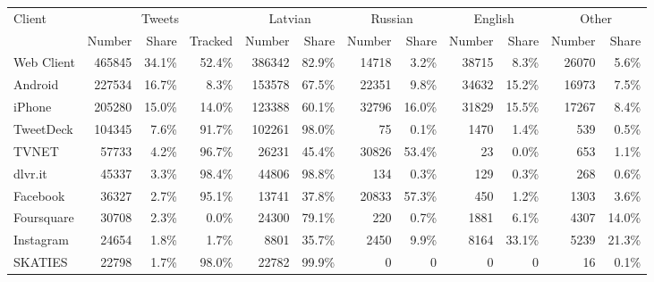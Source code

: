 \begin{tabular}{lrrrrrrrrrrr} 
\toprule
\multirow{2}{*}{Client} & \multicolumn{3}{c}{Tweets} & \multicolumn{2}{c}{Latvian} & \multicolumn{2}{c}{Russian} & \multicolumn{2}{c}{English} & \multicolumn{2}{c}{Other} \\
\cmidrule(r){2-4} \cmidrule(r){5-6} \cmidrule(r){7-8} \cmidrule(r){9-10} \cmidrule(r){11-12}
{} &  Number & Share & Tracked & Number & Share & Number & Share & Number & Share & Number & Share \\
\midrule
Web Client          &      465845 &       34.1\% &                52.4\% &            386342 &             82.9\% &             14718 &              3.2\% &             38715 &              8.3\% &            26070 &             5.6\% \\
Android             &      227534 &       16.7\% &                 8.3\% &            153578 &             67.5\% &             22351 &              9.8\% &             34632 &             15.2\% &            16973 &             7.5\% \\
iPhone              &      205280 &       15.0\% &                14.0\% &            123388 &             60.1\% &             32796 &             16.0\% &             31829 &             15.5\% &            17267 &             8.4\% \\
TweetDeck           &      104345 &        7.6\% &                91.7\% &            102261 &             98.0\% &                75 &              0.1\% &              1470 &              1.4\% &              539 &             0.5\% \\
TVNET               &       57733 &        4.2\% &                96.7\% &             26231 &             45.4\% &             30826 &             53.4\% &                23 &              0.0\% &              653 &             1.1\% \\
dlvr.it             &       45337 &        3.3\% &                98.4\% &             44806 &             98.8\% &               134 &              0.3\% &               129 &              0.3\% &              268 &             0.6\% \\
Facebook            &       36327 &        2.7\% &                95.1\% &             13741 &             37.8\% &             20833 &             57.3\% &               450 &              1.2\% &             1303 &             3.6\% \\
Foursquare          &       30708 &        2.3\% &                 0.0\% &             24300 &             79.1\% &               220 &              0.7\% &              1881 &              6.1\% &             4307 &            14.0\% \\
Instagram           &       24654 &        1.8\% &                 1.7\% &              8801 &             35.7\% &              2450 &              9.9\% &              8164 &             33.1\% &             5239 &            21.3\% \\
SKATIES             &       22798 &        1.7\% &                98.0\% &             22782 &             99.9\% &                 0 &                 0 &                 0 &                 0 &               16 &             0.1\% \\
\bottomrule
\end{tabular}
